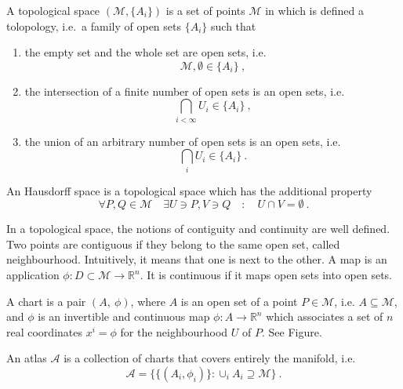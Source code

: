     \begin{definition}
        A topological space $(\mathcal M, \{A_i\})$ is a set of points $\mathcal M$ in which is defined a tolopology, i.e.~a family of open sets $\{A_i\}$ such that 
    \begin{enumerate}
        \item the empty set and the whole set are open sets, i.e.
            \begin{equation*}
                \mathcal M, \emptyset \in \{A_i\} ~,
            \end{equation*}
        \item the intersection of a finite number of open sets is an open sets, i.e.
            \begin{equation*}
                \bigcap_{i<\infty} U_i \in \{A_i\} ~,
            \end{equation*}
        \item the union of an arbitrary number of open sets is an open sets, i.e.
            \begin{equation*}
                \bigcap_{i} U_i \in \{A_i\} ~.
            \end{equation*}
    \end{enumerate}
    \end{definition}
    \begin{definition}
    An Hausdorff space is a topological space which has the additional property  
    \begin{equation*}
        \forall P, Q \in \mathcal M \quad \exists U \ni P, V \ni Q \quad \colon \quad U \cap V = \emptyset ~.
    \end{equation*}
    \end{definition}
    \noindent In a topological space, the notions of contiguity and continuity are well defined. Two points are contiguous if they belong to the same open set, called neighbourhood. Intuitively, it means that one is next to the other. A map is an application $\phi \colon D \subset \mathcal M \rightarrow \mathbb R^n$. It is continuous if it maps open sets into open sets. 

    \begin{definition}[Chart]
        A chart is a pair $(A, ~\phi)$, where $A$ is an open set of a point $P \in \mathcal M$, i.e. $A \subseteq \mathcal M$, and $\phi$ is an invertible and continuous map $\phi \colon A \rightarrow \mathbb R^n$ which associates a set of $n$ real coordinates $x^i = \phi$ for the neighbourhood $U$ of $P$. See Figure.
    \end{definition}
    \begin{definition}[Atlas]
        An atlas $\mathcal A$ is a collection of charts that covers entirely the manifold, i.e. 
    \begin{equation*}
        \mathcal A = \{\{(A_i, \phi_i)\} \colon \cup_i A_i \supseteq \mathcal M \} ~.
    \end{equation*}
    \end{definition}

